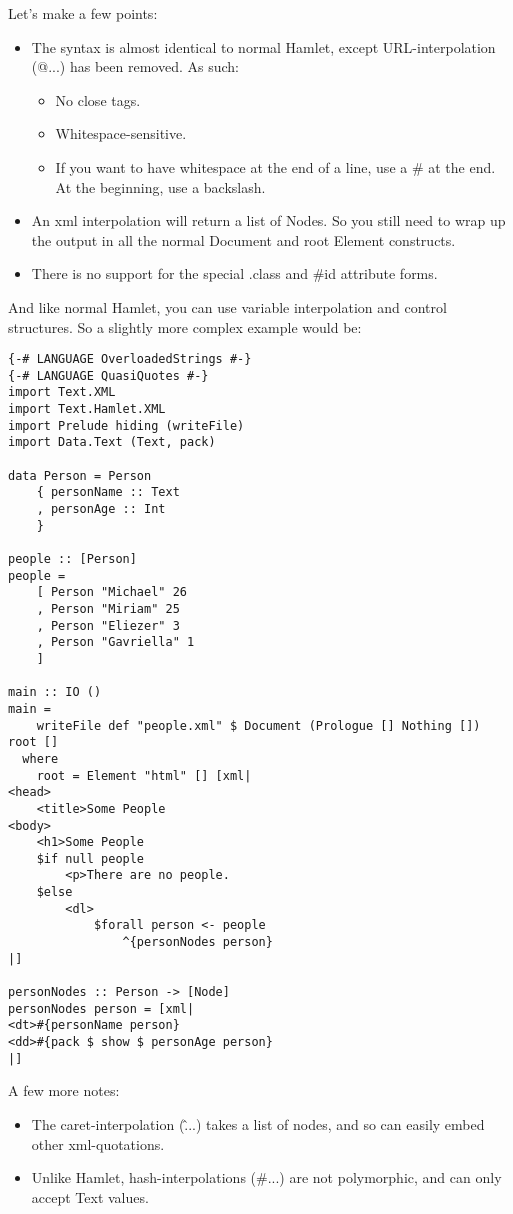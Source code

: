 Let's make a few points:

\begin{itemize}
\item The syntax is almost identical to normal Hamlet, except URL-interpolation (@{...}) has been removed. As such:

\begin{itemize}
\item No close tags.
\item Whitespace-sensitive.
\item If you want to have whitespace at the end of a line, use a \# at the end. At the beginning, use a backslash.
\end{itemize}
  
\item An xml interpolation will return a list of Nodes. So you still need to wrap up the output in all the normal Document and root Element constructs.
\item There is no support for the special .class and \#id attribute forms.
\end{itemize}

And like normal Hamlet, you can use variable interpolation and control structures. So a slightly more complex example would be:

\begin{lstlisting}
{-# LANGUAGE OverloadedStrings #-}
{-# LANGUAGE QuasiQuotes #-}
import Text.XML
import Text.Hamlet.XML
import Prelude hiding (writeFile)
import Data.Text (Text, pack)

data Person = Person
    { personName :: Text
    , personAge :: Int
    }

people :: [Person]
people =
    [ Person "Michael" 26
    , Person "Miriam" 25
    , Person "Eliezer" 3
    , Person "Gavriella" 1
    ]

main :: IO ()
main =
    writeFile def "people.xml" $ Document (Prologue [] Nothing []) root []
  where
    root = Element "html" [] [xml|
<head>
    <title>Some People
<body>
    <h1>Some People
    $if null people
        <p>There are no people.
    $else
        <dl>
            $forall person <- people
                ^{personNodes person}
|]

personNodes :: Person -> [Node]
personNodes person = [xml|
<dt>#{personName person}
<dd>#{pack $ show $ personAge person}
|]
\end{lstlisting}%

A few more notes:

\begin{itemize}
\item The caret-interpolation (\^{...}) takes a list of nodes, and so can easily embed other xml-quotations.
\item Unlike Hamlet, hash-interpolations (\#{...}) are not polymorphic, and can only accept Text values.
\end{itemize}

